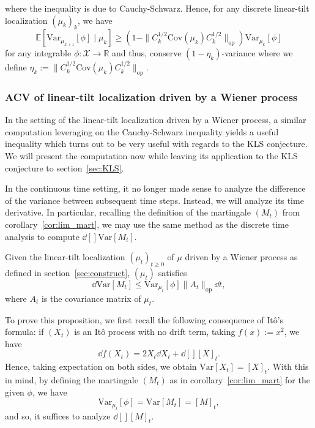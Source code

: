 where the inequality is due to Cauchy-Schwarz. Hence, for any discrete linear-tilt 
localization \((\mu_k)_k\), we have
\begin{equation}\label{eq:linear-tilt_ACV}
  \mathbb{E}[\text{Var}_{\mu_{k + 1}}[\phi] \mid \mu_k] \ge 
    (1 - \|C_k^{1 / 2}\text{Cov}(\mu_k)C_k^{1 / 2}\|_{\text{op}})\text{Var}_{\mu_k}[\phi]
\end{equation}
for any integrable \(\phi : \mathcal{X} \to \mathbb{R}\) and thus, conserve \((1 - \eta_k)\)-variance 
where we define \(\eta_k := \|C_k^{1 / 2}\text{Cov}(\mu_k)C_k^{1 / 2}\|_{\text{op}}\). 

\subsubsection{ACV of linear-tilt localization driven by a Wiener process}

In the setting of the linear-tilt localization driven by a Wiener process, a similar computation 
leveraging on the Cauchy-Schwarz inequality yields a useful inequality which turns out to be very 
useful with regards to the KLS conjecture. We will present the computation now while leaving its application to 
the KLS conjecture to section~\ref{sec:KLS}.

In the continuous time setting, it no longer made sense to analyze the difference of the variance 
between subsequent time steps. Instead, we will analyze its time derivative. In particular, recalling 
the definition of the martingale \((M_t)\) from corollary~\ref{cor:lim_mart}, we may use the same 
method as the discrete time analysis to compute \(\dd[] \text{Var}[M_t]\).

\begin{proposition}\label{prop:linear-tilt_ACV}
  Given the linear-tilt localization \((\mu_t)_{t \ge 0}\) of \(\mu\) driven by a Wiener process as defined 
  in section~\ref{sec:construct}, \((\mu_t)\) satisfies 
  \[\dd \text{Var}[M_t] \le \text{Var}_{\mu_t}[\phi] \|A_t\|_\text{op} \dd t,\]
  where \(A_t\) is the covariance matrix of \(\mu_t\).
\end{proposition}

To prove this proposition, we first recall the following consequence of Itô's formula: if \((X_t)\) 
is an Itô process with no drift term, taking \(f(x) := x^2\), we have  
\[\dd f(X_t) = 2 X_t \dd X_t + \dd[] [X]_t.\]
Hence, taking expectation on both sides, we obtain \(\text{Var}[X_t] = [X]_t\). With this 
in mind, by defining the martingale \((M_t)\) as in corollary~\ref{cor:lim_mart} for the given 
\(\phi\), we have 
\[\text{Var}_{\mu_t}[\phi] = \text{Var}[M_t] = [M]_t,\]
and so, it suffices to analyze \(\dd[] [M]_t\).

